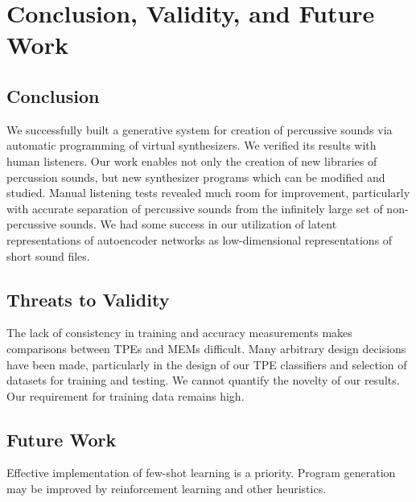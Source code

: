 \documentclass[\main/thesis.tex]{subfiles}
\begin{document}
\chapter{Conclusion, Validity, and Future Work} 

\section{Conclusion} We successfully built a generative system for creation of percussive sounds via automatic programming of virtual synthesizers. We verified its results with human listeners.
Our work enables not only the creation of new libraries of percussion sounds, but new synthesizer programs which can be modified and studied. 
Manual listening tests revealed much room for improvement, particularly with accurate separation of percussive sounds from the infinitely large set of non-percussive sounds. We had some success in our utilization of latent representations of autoencoder networks as low-dimensional representations of short sound files. \\ 
\section{Threats to Validity} The lack of consistency in training and accuracy measurements makes comparisons between TPEs and MEMs difficult. Many arbitrary design decisions have been made, particularly in the design of our TPE classifiers and selection of datasets for training and testing. We cannot quantify the novelty of our results. Our requirement for training data remains high. \\
\section{Future Work} Effective implementation of few-shot learning is a priority. Program generation may be improved by reinforcement learning and other heuristics.
\end{document}
